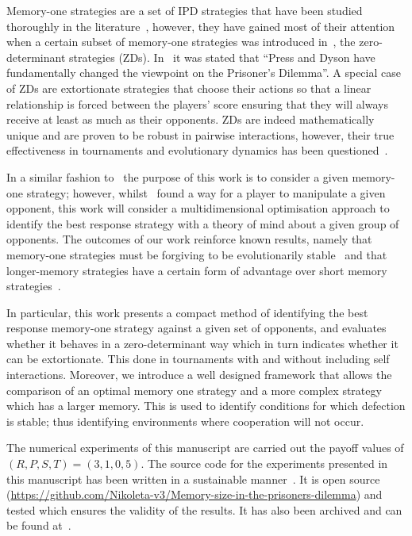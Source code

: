 \documentclass[10pt]{article}
\begin{document}
Memory-one strategies are a set of IPD strategies that have been
studied thoroughly in the literature~\cite{Nowak1990, Nowak1993}, however, they have gained
most of their attention when a certain subset of memory-one strategies was
introduced in~\cite{Press2012}, the zero-determinant strategies (ZDs). In~\cite{Stewart2012} it
was stated that ``Press and Dyson have fundamentally changed the viewpoint on
the Prisoner's Dilemma''.
A special case of ZDs are extortionate strategies that choose their actions so that a linear relationship is forced
between the players' score ensuring that they will always
receive at least as much as their opponents. ZDs are
indeed mathematically unique and are proven to be robust in pairwise
interactions, however, their true effectiveness in tournaments and
evolutionary dynamics has been questioned~\cite{adami2013, Hilbe2013b,
Hilbe2013, Hilbe2015, Knight2018, Harper2015}.

In a similar fashion to~\cite{Press2012} the purpose of this work is to consider
a given memory-one strategy; however, whilst~\cite{Press2012} found a way for a
player to manipulate a given opponent, this work will consider a
multidimensional optimisation approach to identify the best response strategy with
a theory of mind about a given
group of opponents. The outcomes of our work reinforce known results, namely
that memory-one strategies must be forgiving to be evolutionarily stable~\cite{Stewart2013, Stewart2016}
and that longer-memory strategies have a certain form of advantage over short memory
strategies~\cite{Hilbe2017, Pan2015}.


In particular, this work presents a compact method of
identifying the best response memory-one strategy against a given set of
opponents, and evaluates whether it behaves in a
zero-determinant way which in turn indicates whether it can be extortionate.
This done in tournaments with and without including self interactions. Moreover, we
introduce a well designed framework that allows the comparison of an optimal
memory one strategy and a more complex strategy which has a larger memory. This
is used to identify conditions for which defection is stable; thus identifying
environments where cooperation will not occur.

The numerical experiments of this manuscript are carried out the payoff values
of \((R, P, S, T) = (3, 1, 0, 5)\). The source code for the experiments presented
in this manuscript has been written in a sustainable manner~\cite{Benureau2018}.
It is open source (\url{https://github.com/Nikoleta-v3/Memory-size-in-the-prisoners-dilemma})
and tested which ensures the validity of the results. It has also been archived
and can be found at~\cite{nikoleta_glynatsi_2019}.
\end{document}
